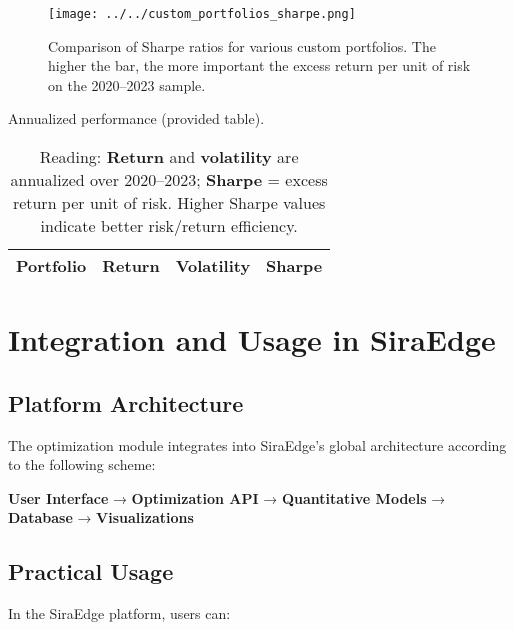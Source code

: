 \documentclass[11pt,a4paper]{article}
\begin{document}
\begin{figure}[h]
  \centering
  \texttt{[image: ../../custom\_portfolios\_sharpe.png]}
  \caption{Comparison of Sharpe ratios for various custom portfolios. The higher the bar, the more important the excess return per unit of risk on the 2020--2023 sample.}
  \label{fig:custom_sharpe_external}
\end{figure}

\begin{table}[h]
  \centering
  \caption{Annualized performance (provided table).}
  \label{tab:summary_external}
  \begin{tabular}{lccc}
    \hline
    Portfolio & Return & Volatility & Sharpe \\
    \hline
    
  \end{tabular}
  \caption*{\footnotesize Reading: \textbf{Return} and \textbf{volatility} are annualized over 2020--2023; \textbf{Sharpe} = excess return per unit of risk. Higher Sharpe values indicate better risk/return efficiency.}
\end{table}

\section{Integration and Usage in SiraEdge}

\subsection{Platform Architecture}
The optimization module integrates into SiraEdge's global architecture according to the following scheme:

\begin{center}
\begin{tcolorbox}[title=SiraEdge Architecture - Optimization Module]
\textbf{User Interface} → \textbf{Optimization API} → \textbf{Quantitative Models} → \textbf{Database} → \textbf{Visualizations}
\end{tcolorbox}
\end{center}

\subsection{Practical Usage}
In the SiraEdge platform, users can:
\end{document}
